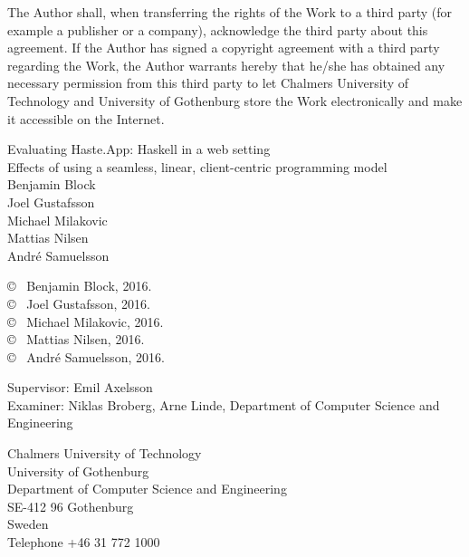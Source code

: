 \documentclass[a4paper]{article}
\begin{document}
The Author shall, when transferring the rights of the Work to a third party (for example a publisher or a company), acknowledge the third party about this agreement. If the Author has signed a copyright agreement with a third party regarding the Work, the Author warrants hereby that he/she has obtained any necessary permission from this third party to let Chalmers University of Technology and University of Gothenburg store the Work electronically and make it accessible on the Internet.

\vspace*{2.5cm}
Evaluating Haste.App: Haskell in a web setting\\
Effects of using a seamless, linear, client-centric programming model\\

Benjamin Block\setlength{\parskip}{1cm}\\
Joel Gustafsson\setlength{\parskip}{1cm}\\
Michael Milakovic\setlength{\parskip}{1cm}\\
Mattias Nilsen\setlength{\parskip}{1cm}\\
André Samuelsson\setlength{\parskip}{1cm}

\copyright ~ Benjamin Block, 2016. \setlength{\parskip}{1cm}\\
\copyright ~ Joel Gustafsson, 2016. \setlength{\parskip}{1cm}\\
\copyright ~ Michael Milakovic, 2016. \setlength{\parskip}{1cm}\\
\copyright ~ Mattias Nilsen, 2016. \setlength{\parskip}{1cm}\\
\copyright ~ André Samuelsson, 2016. \setlength{\parskip}{1cm}

Supervisor: Emil Axelsson\\
Examiner: Niklas Broberg, Arne Linde, Department of Computer Science and Engineering\setlength{\parskip}{1cm}

Chalmers University of Technology\\
University of Gothenburg\\
Department of Computer Science and Engineering\\
SE-412 96 Gothenburg\\
Sweden\\
Telephone +46 31 772 1000 \setlength{\parskip}{0.5cm}

\vfill
\end{document}

